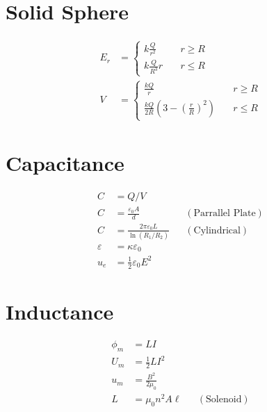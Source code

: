\documentclass[10pt]{article}
\begin{document}
\begin{multicols*}{5}
\section{Solid Sphere}

\begin{align*}
    E_r &=
    \begin{cases}
    k \frac{Q}{r^2} & \quad r \geq R\\
    k \frac{Q}{R^3} r & \quad r \leq R
    \end{cases}\\
    V &=
    \begin{cases}
    \frac{kQ}{r} & \quad r \geq R\\
    \frac{kQ}{2R} \left({3 - \left({\frac{r}{R}}\right)^2}\right) &
    \quad r \leq R
    \end{cases}
\end{align*}

\section{Capacitance}

\begin{align*}
    C &= Q / V\\
    C &= \frac{\varepsilon_0 A}{d} && (\text{Parrallel Plate})\\
    C &= \frac{2\pi \varepsilon_0 L}{\ln (R_1 / R_2)} &&
    (\text{Cylindrical})\\
    \varepsilon &= \kappa \varepsilon_0\\
    u_e &= \frac{1}{2}\varepsilon_0 E^2
\end{align*}

\section{Inductance}

\begin{align*}
    \phi_m &= LI\\
    U_m &= \frac{1}{2} LI^2\\
    u_m &= \frac{B^2}{2\mu_0}\\
    L &= \mu_0 n^2 A \ell && (\text{Solenoid})
\end{align*}

\end{multicols*}
\newpage
\end{document}
